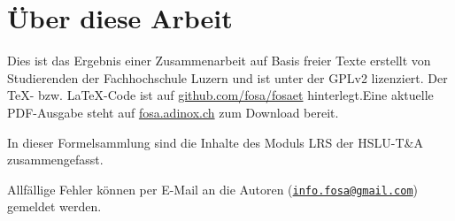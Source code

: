 



\chapter*{Über diese Arbeit}
Dies ist das Ergebnis einer Zusammenarbeit auf Basis freier Texte erstellt von 
Studierenden der Fachhochschule Luzern und ist unter der GPLv2 lizenziert. Der 
\TeX - bzw. \LaTeX -Code ist auf \url{github.com/fosa/fosaet} hinterlegt.Eine 
aktuelle PDF-Ausgabe steht auf \url{fosa.adinox.ch} zum Download bereit.

In dieser Formelsammlung sind die Inhalte des Moduls LRS der HSLU-T\&A 
zusammengefasst. 

Allfällige Fehler können per E-Mail an die Autoren 
(\href{mailto:info.fosa@gmail.com}{\nolinkurl{info.fosa@gmail.com}}) 
gemeldet werden. 
